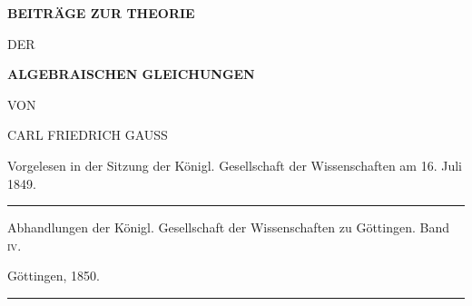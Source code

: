 \clearpage
{}
\thispagestyle{empty}
\begin{center}
\vspace*{.45in}
{\Large\bfseries BEITRÄGE ZUR THEORIE\par}
\bigskip
DER\par
\bigskip
{\Large\bfseries ALGEBRAISCHEN GLEICHUNGEN\par}
\bigskip\bigskip
VON\par
\bigskip
{\large CARL FRIEDRICH GAUSS\par}
\bigskip
Vorgelesen in der Sitzung der Königl. Gesellschaft der Wissenschaften
am 16. Juli 1849.\par
\bigskip
\rule{0.6\linewidth}{0.4pt}\par
Abhandlungen der Königl. Gesellschaft der Wissenschaften zu Göttingen.
Band \textsc{iv}.\par
Göttingen, 1850.\par
\rule{0.6\linewidth}{0.4pt}
\end{center}
\clearpage
